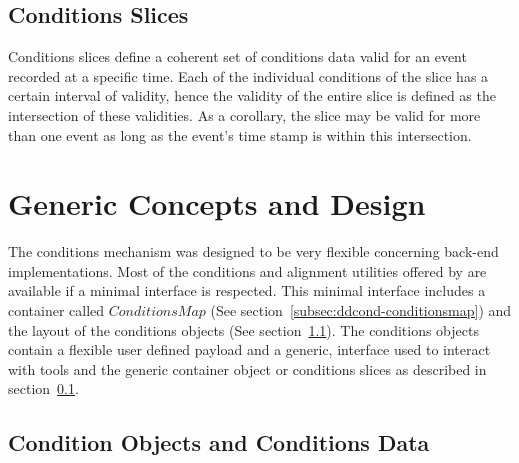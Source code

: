 \documentclass[10pt,a4paper]{article}
\begin{document}
\subsection{Conditions Slices}
\label{subsec:ddcond-conditions-slices}

\noindent
Conditions slices define a coherent set of conditions data valid for an event 
recorded at a specific time. Each of the individual conditions of the slice
has a certain interval of validity, hence the validity of the entire slice
is defined as the intersection of these validities.
As a corollary, the slice may be valid for more than one event as long as the
event's time stamp is within this intersection.

\newpage
\section{Generic Concepts and Design}
\label{sec:ddcond-design-concepts}

\noindent 
The \DDH conditions mechanism was designed to be very flexible concerning 
back-end implementations. Most of the conditions and alignment utilities offered 
by \DDH are available if a minimal interface is respected. This minimal interface
includes a container called $ConditionsMap$ (See section~\ref{subsec:ddcond-conditionsmap})
and the layout of the conditions objects (See section~\ref{subsec:ddcond-conditions-data}).
The conditions objects contain a flexible user defined payload and a generic, 
interface used to interact with tools and the generic container object or
conditions slices as described in section~\ref{subsec:ddcond-conditions-slices}.

\subsection{Condition Objects and Conditions Data}
\label{subsec:ddcond-conditions-data}
\end{document}
